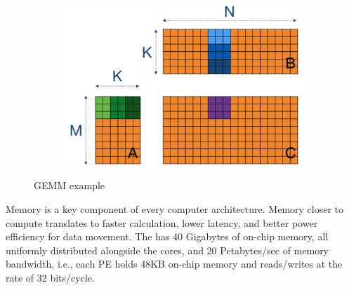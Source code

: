 \begin{figure}[b!]
  \centering
  \begin{subfigure}{0.70\columnwidth}
    \includegraphics[width=\linewidth]{figures/gemm_overview.png}
  \end{subfigure}
  \caption{GEMM example}
  \label{fig:gemm_overview}
\end{figure}

Memory is a key component of every computer architecture. 
%
Memory closer to compute translates to faster calculation, lower latency, and better power efficiency for data movement. 
%
The \wse has 40 Gigabytes of on-chip memory, all uniformly distributed alongside the cores, and 20 Petabytes/sec of memory bandwidth, i.e., each PE holds 48KB on-chip memory and reads/writes at the rate of 32 bits/cycle.